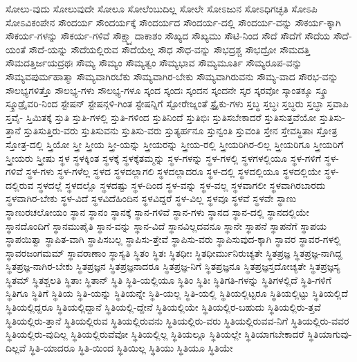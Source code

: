 {ಸೋಲು-ವುದು
ಸೋಲುವುದೇ
ಸೋಲೂ
ಸೋಲೆಂಬುದಿಲ್ಲ
ಸೋಲೇ
ಸೋಽಜುನ
ಸೋಽಧಿಗಚ್ಛತಿ
ಸೋಽಪಿ
ಸೋಽವಿಕಂಪೇನ
ಸೌಂದರ್ಯ
ಸೌಂದರ್ಯಕ್ಕೆ
ಸೌಂದರ್ಯದ
ಸೌಂದರ್ಯ-ದಲ್ಲಿ
ಸೌಂದರ್ಯ-ವನ್ನು
ಸೌಕರ್ಯ-ಕ್ಕಾಗಿ
ಸೌಕರ್ಯ-ಗಳನ್ನು
ಸೌಕರ್ಯ-ಗಳಿವೆ
ಸೌಕ್ಷ್ಮ್ಯಾದಾಕಾಶಂ
ಸೌಖ್ಯದ
ಸೌಖ್ಯಮು
ಸೌಟಿ-ನಿಂದ
ಸೌದೆ
ಸೌದೆಗೆ
ಸೌದೆಯ
ಸೌದೆ-ಯಂತೆ
ಸೌದೆ-ಯನ್ನು
ಸೌದೆಯಲ್ಲಿರುವ
ಸೌದೆಯೆಲ್ಲ
ಸೌಧ
ಸೌಧ-ವನ್ನು
ಸೌಭದ್ರಶ್ಚ
ಸೌಭದ್ರೋ
ಸೌಮದತ್ತಿ
ಸೌಮದತ್ತಿರ್ಜಯದ್ರಥಃ
ಸೌಮ್ಯ
ಸೌಮ್ಯಂ
ಸೌಮ್ಯತ್ವಂ
ಸೌಮ್ಯಭಾವ
ಸೌಮ್ಯಮೂರ್ತಿ
ಸೌಮ್ಯರೂಪ-ವನ್ನು
ಸೌಮ್ಯವಪುರ್ಮಹಾತ್ಮಾ
ಸೌಮ್ಯವಾಗಿರಬೆಕು
ಸೌಮ್ಯವಾಗಿರ-ಬೇಕು
ಸೌಮ್ಯವಾಗಿರುವನು
ಸೌಮ್ಯ-ವಾದ
ಸೌರಭ-ವನ್ನು
ಸೌಲಭ್ಯಗಳಿತ್ತೊ
ಸೌಲಭ್ಯ-ಗಳು
ಸೌಲಭ್ಯ-ಗಳೂ
ಸ್ಕಂದ
ಸ್ಕಂದಃ
ಸ್ಕಂದನ
ಸ್ಕಂದನೇ
ಸ್ಕರ
ಸ್ಕರವೋ
ಸ್ಕಾಂತಕ್ಕೂ
ಸ್ಕ್ರೂ
ಸ್ಕ್ರೂಡ್ರೈವರಿ-ನಿಂದ
ಸ್ಟೇಷನ್
ಸ್ಟೇಷನ್ಗಳಿ-ಗಿಂತ
ಸ್ಟೇಷನ್ನಿಗೆ
ಸ್ಟೋರೇಜ್ನಂತೆ
ಸ್ಟ್ರೈಕು-ಗಳು
ಸ್ತಬ್ಧ
ಸ್ತಬ್ಧಃ
ಸ್ತಬ್ಧರು
ಸ್ತಬ್ಧಾ
ಸ್ತವಾಪಿ
ಸ್ತವೈ-
ಸ್ತಿಮಿತಕ್ಕೆ
ಸ್ತುತಿ
ಸ್ತುತಿ-ಗಳಲ್ಲಿ
ಸ್ತುತಿ-ಗಳಿಂದ
ಸ್ತುತಿನಿಂದೆ
ಸ್ತುತಿಭಿಃ
ಸ್ತುತಿಸಬೇಕಾದರೆ
ಸ್ತುತಿಸುತ್ತವೆಯೋ
ಸ್ತುತಿಸು-ತ್ತಾನೆ
ಸ್ತುತಿಸುತ್ತಿರು-ವರು
ಸ್ತುತಿಸುವನು
ಸ್ತುತಿಸು-ವರು
ಸ್ತುತ್ಯರ್ಹನೂ
ಸ್ತುನ್ವಂತಿ
ಸ್ತುವಂತಿ
ಸ್ತೇನ
ಸ್ತೇವಸ್ಥಿತಾಃ
ಸ್ತೋತ್ರ
ಸ್ತೋತ್ರ-ದಲ್ಲಿ
ಸ್ತ್ರಿಯೋ
ಸ್ತ್ರೀ
ಸ್ತ್ರೀಯ
ಸ್ತ್ರೀ-ಯನ್ನು
ಸ್ತ್ರೀಯರನ್ನು
ಸ್ತ್ರೀಯ-ರಲ್ಲಿ
ಸ್ತ್ರೀಯರಿಗಿರ-ಲಿಲ್ಲ
ಸ್ತ್ರೀಯರಿಗೂ
ಸ್ತ್ರೀಯರಿಗೆ
ಸ್ತ್ರೀಯರು
ಸ್ತ್ರೀಷು
ಸ್ಥಳ
ಸ್ಥಳಕ್ಕಿಂತ
ಸ್ಥಳಕ್ಕೆ
ಸ್ಥಳಕ್ಕೆತಮ್ಮನ್ನು
ಸ್ಥಳ-ಗಳನ್ನು
ಸ್ಥಳ-ಗಳಲ್ಲಿ
ಸ್ಥಳಗಳಲ್ಲಿಯೂ
ಸ್ಥಳ-ಗಳಿಗೆ
ಸ್ಥಳ-ಗಳಿವೆ
ಸ್ಥಳ-ಗಳು
ಸ್ಥಳ-ಗಳೆಲ್ಲ
ಸ್ಥಳದ
ಸ್ಥಳದಲ್ಲಾಗಲಿ
ಸ್ಥಳದಲ್ಲಾದರೂ
ಸ್ಥಳ-ದಲ್ಲಿ
ಸ್ಥಳದಲ್ಲಿಯೂ
ಸ್ಥಳದಲ್ಲಿಯೇ
ಸ್ಥಳ-ದಲ್ಲಿರುವ
ಸ್ಥಳದಲ್ಲೆ
ಸ್ಥಳದಲ್ಲೊ
ಸ್ಥಳದಷ್ಟು
ಸ್ಥಳ-ದಿಂದ
ಸ್ಥಳ-ವನ್ನು
ಸ್ಥಳ-ವಲ್ಲ
ಸ್ಥಳವಾಗಲೀ
ಸ್ಥಳವಾಗಿರಬಾರದು
ಸ್ಥಳವಾಗಿರ-ಬೇಕು
ಸ್ಥಳ-ವಿದೆ
ಸ್ಥಳವಿದೆಹಿಂದಿನ
ಸ್ಥಳವಿದ್ದರೆ
ಸ್ಥಳ-ವಿಲ್ಲ
ಸ್ಥಳವೂ
ಸ್ಥಳವೆ
ಸ್ಥಳವೇ
ಸ್ಥಾಣು
ಸ್ಥಾಣುರಚಲೋಯಂ
ಸ್ಥಾನ
ಸ್ಥಾನಂ
ಸ್ಥಾನಕ್ಕೆ
ಸ್ಥಾನ-ಗಳಿವೆ
ಸ್ಥಾನ-ಗಳು
ಸ್ಥಾನದ
ಸ್ಥಾನ-ದಲ್ಲಿ
ಸ್ಥಾನದಲ್ಲಿಯೇ
ಸ್ಥಾನದೊಂದಿಗೆ
ಸ್ಥಾನಮುಪೈತಿ
ಸ್ಥಾನ-ವನ್ನು
ಸ್ಥಾನ-ವಿದೆ
ಸ್ಥಾನವಿಲ್ಲದವನೂ
ಸ್ಥಾನೇ
ಸ್ಥಾಪನೆ
ಸ್ಥಾಪನೆಗೆ
ಸ್ಥಾಪಯ
ಸ್ಥಾಪಯಿತ್ವಾ
ಸ್ಥಾಪಿತ-ವಾಗಿ
ಸ್ಥಾಪಿಸಬಲ್ಲ
ಸ್ಥಾಪಿಸು-ತ್ತೇವೆ
ಸ್ಥಾಪಿಸು-ವರು
ಸ್ಥಾಪಿಸುವುದ-ಕ್ಕಾಗಿ
ಸ್ಥಾವರ
ಸ್ಥಾವರ-ಗಳಲ್ಲಿ
ಸ್ಥಾವರಜಂಗಮಮ್
ಸ್ಥಾವರಾಣಾಂ
ಸ್ಥಾಸ್ಯತಿ
ಸ್ಥಿತಂ
ಸ್ಥಿತಃ
ಸ್ಥಿತಧೀಃ
ಸ್ಥಿತಧೀರ್ಮುನಿರುಚ್ಯತೇ
ಸ್ಥಿತಪ್ರಜ್ಞ
ಸ್ಥಿತಪ್ರಜ್ಞ-ನಾಗಿದ್ದ
ಸ್ಥಿತಪ್ರಜ್ಞ-ನಾಗಿರ-ಬೇಕು
ಸ್ಥಿತಪ್ರಜ್ಞನ
ಸ್ಥಿತಪ್ರಜ್ಞನಾದರೂ
ಸ್ಥಿತಪ್ರಜ್ಞ-ನಿಗೆ
ಸ್ಥಿತಪ್ರಜ್ಞನೂ
ಸ್ಥಿತಪ್ರಜ್ಞಸ್ತದೋಚ್ಯತೇ
ಸ್ಥಿತಪ್ರಜ್ಞಸ್ಯ
ಸ್ಥಿತಮ್
ಸ್ಥಿತಶ್ಚಲತಿ
ಸ್ಥಿತಾಃ
ಸ್ಥಿತಾನ್
ಸ್ಥಿತಿ
ಸ್ಥಿತಿ-ಯಲ್ಲಿಯೂ
ಸ್ಥಿತಿಂ
ಸ್ಥಿತಿಃ
ಸ್ಥಿತಿಗತಿ-ಗಳನ್ನು
ಸ್ಥಿತಿಗಳಲ್ಲಿದೆ
ಸ್ಥಿತಿ-ಗಳಿಗೆ
ಸ್ಥಿತಿಗೂ
ಸ್ಥಿತಿಗೆ
ಸ್ಥಿತಿಯ
ಸ್ಥಿತಿ-ಯನ್ನು
ಸ್ಥಿತಿಯನ್ನೇ
ಸ್ಥಿತಿ-ಯಲ್ಲ
ಸ್ಥಿತಿ-ಯಲ್ಲಿ
ಸ್ಥಿತಿಯಲ್ಲಿಟ್ಟರೂ
ಸ್ಥಿತಿಯಲ್ಲಿಟ್ಟು
ಸ್ಥಿತಿಯಲ್ಲಿದೆ
ಸ್ಥಿತಿಯಲ್ಲಿದ್ದರೂ
ಸ್ಥಿತಿಯಲ್ಲಿದ್ದಾನೆ
ಸ್ಥಿತಿಯಲ್ಲಿ-ದ್ದೇನೆ
ಸ್ಥಿತಿಯಲ್ಲಿಯೇ
ಸ್ಥಿತಿಯಲ್ಲಿರ-ಬಹುದು
ಸ್ಥಿತಿಯಲ್ಲಿರು-ತ್ತವೆ
ಸ್ಥಿತಿಯಲ್ಲಿರು-ತ್ತಾನೆ
ಸ್ಥಿತಿಯಲ್ಲಿರುವ
ಸ್ಥಿತಿಯಲ್ಲಿರುವನು
ಸ್ಥಿತಿಯಲ್ಲಿರು-ವರು
ಸ್ಥಿತಿಯಲ್ಲಿರುವವ-ನಿಗೆ
ಸ್ಥಿತಿಯಲ್ಲಿರು-ವವರ
ಸ್ಥಿತಿಯಲ್ಲಿರು-ವುದಿಲ್ಲ
ಸ್ಥಿತಿಯಲ್ಲಿರುವೆವೋ
ಸ್ಥಿತಿಯಲ್ಲಿಲ್ಲ
ಸ್ಥಿತಿಯಲ್ಲೂ
ಸ್ಥಿತಿಯಲ್ಲೇ
ಸ್ಥಿತಿಯಾಗಬೇಕಾದರೆ
ಸ್ಥಿತಿಯಾಗುವು-ದಿಲ್ಲವೆ
ಸ್ಥಿತಿ-ಯಾದರೂ
ಸ್ಥಿತಿ-ಯಿಂದ
ಸ್ಥಿತಿಯಿಲ್ಲ
ಸ್ಥಿತಿಯು
ಸ್ಥಿತಿಯೂ
ಸ್ಥಿತಿಯೇ
}
